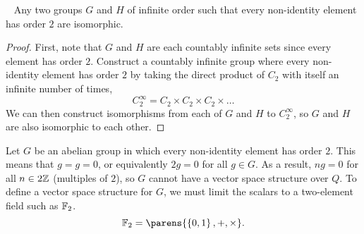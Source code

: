 \begin{claim}~\label{claim:abelian-order-two-infinite-isomorphic}
  Any two groups $G$ and $H$ of infinite order such that every non-identity element
  has order $2$ are isomorphic.

  \begin{proof}
    First, note that $G$ and $H$ are each countably infinite sets since every element
    has order $2$.
    Construct a countably infinite group where every non-identity element has order $2$
    by taking the direct product of $C_2$ with itself an infinite number of times,
    \[
      C_2^{\infty} = C_2 \times C_2 \times C_2 \times \ldots 
    \]
    We can then construct isomorphisms from each of $G$ and $H$ to $C_2^{\infty}$,
    so $G$ and $H$ are also isomorphic to each other.
  \end{proof}
\end{claim}

Let $G$ be an abelian group in which every non-identity element has order $2$.
This means that $g = g = 0$, or equivalently $2g = 0$ for all $g \in G$.
As a result, $ng = 0$ for all $n \in 2\mathbb{Z}$ (multiples of $2$), so $G$ cannot have
a vector space structure over $Q$.
To define a vector space structure for $G$, we must limit the scalars to a
two-element field such as $\mathbb{F}_2$.
\[ \F_2 = \parens{\set{0, 1}, +, \times}. \]

